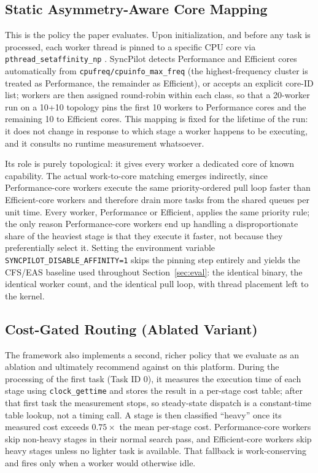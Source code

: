 \documentclass[conference]{IEEEtran}
\begin{document}
\subsection{Static Asymmetry-Aware Core Mapping}
\label{sec:asymmap}
This is the policy the paper evaluates. Upon initialization, and before any task is processed, each worker thread is pinned to a specific CPU core via \texttt{pthread\_setaffinity\_np} \cite{man7pthreadaffinity}. SyncPilot detects Performance and Efficient cores automatically from \texttt{cpufreq/cpuinfo\_max\_freq} (the highest-frequency cluster is treated as Performance, the remainder as Efficient), or accepts an explicit core-ID list; workers are then assigned round-robin within each class, so that a 20-worker run on a 10+10 topology pins the first 10 workers to Performance cores and the remaining 10 to Efficient cores. This mapping is fixed for the lifetime of the run: it does not change in response to which stage a worker happens to be executing, and it consults no runtime measurement whatsoever.

Its role is purely topological: it gives every worker a dedicated core of known capability. The actual work-to-core matching emerges indirectly, since Performance-core workers execute the same priority-ordered pull loop faster than Efficient-core workers and therefore drain more tasks from the shared queues per unit time. Every worker, Performance or Efficient, applies the same priority rule; the only reason Performance-core workers end up handling a disproportionate share of the heaviest stage is that they execute it faster, not because they preferentially select it. Setting the environment variable \texttt{SYNCPILOT\_DISABLE\_AFFINITY=1} skips the pinning step entirely and yields the CFS/EAS baseline used throughout Section~\ref{sec:eval}: the identical binary, the identical worker count, and the identical pull loop, with thread placement left to the kernel.

\subsection{Cost-Gated Routing (Ablated Variant)}
\label{sec:capacityaware}
The framework also implements a second, richer policy that we evaluate as an ablation and ultimately recommend against on this platform. During the processing of the first task (Task ID 0), it measures the execution time of each stage using \texttt{clock\_gettime} and stores the result in a per-stage cost table; after that first task the measurement stops, so steady-state dispatch is a constant-time table lookup, not a timing call. A stage is then classified ``heavy'' once its measured cost exceeds $0.75\times$ the mean per-stage cost. Performance-core workers skip non-heavy stages in their normal search pass, and Efficient-core workers skip heavy stages unless no lighter task is available. That fallback is work-conserving and fires only when a worker would otherwise idle.
\end{document}
